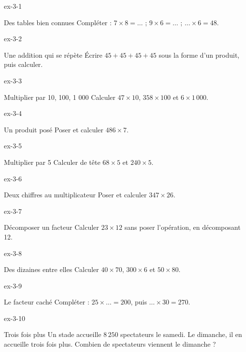 \clearpage{}
\begin{blocLivre}{ex-3-1}\begin{exercice}[1]{Des tables bien connues}
Compléter : $7\times8=\ldots$ ; $9\times6=\ldots$ ; $\ldots\times6=48$.
\end{exercice}\end{blocLivre}
\begin{blocLivre}{ex-3-2}\begin{exercice}[1]{Une addition qui se répète}
Écrire $45+45+45+45$ sous la forme d’un produit, puis calculer.
\end{exercice}\end{blocLivre}
\begin{blocLivre}{ex-3-3}\begin{exercice}[1]{Multiplier par 10, 100, 1 000}
Calculer $47\times10$, $358\times100$ et $6\times1\,000$.
\end{exercice}\end{blocLivre}
\begin{blocLivre}{ex-3-4}\begin{exercice}[1]{Un produit posé}
Poser et calculer $486\times7$.
\end{exercice}\end{blocLivre}
\begin{blocLivre}{ex-3-5}\begin{exercice}[1]{Multiplier par 5}
Calculer de tête $68\times5$ et $240\times5$.
\end{exercice}\end{blocLivre}

\begin{blocLivre}{ex-3-6}\begin{exercice}[2]{Deux chiffres au multiplicateur}
Poser et calculer $347\times26$.
\end{exercice}\end{blocLivre}
\begin{blocLivre}{ex-3-7}\begin{exercice}[2]{Décomposer un facteur}
Calculer $23\times12$ sans poser l’opération, en décomposant 12.
\end{exercice}\end{blocLivre}
\begin{blocLivre}{ex-3-8}\begin{exercice}[2]{Des dizaines entre elles}
Calculer $40\times70$, $300\times6$ et $50\times80$.
\end{exercice}\end{blocLivre}
\begin{blocLivre}{ex-3-9}\begin{exercice}[2]{Le facteur caché}
Compléter : $25\times\ldots=200$, puis $\ldots\times30=270$.
\end{exercice}\end{blocLivre}
\begin{blocLivre}{ex-3-10}\begin{exercice}[2]{Trois fois plus}
Un stade accueille $8\,250$ spectateurs le samedi. Le dimanche, il en accueille trois fois plus. Combien de spectateurs viennent le dimanche ?
\end{exercice}\end{blocLivre}

